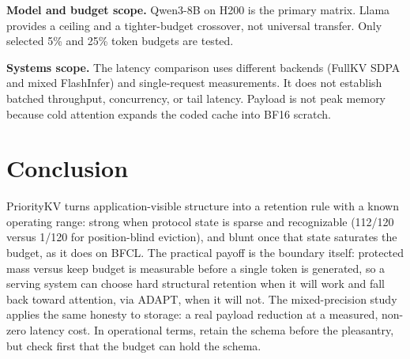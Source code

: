 \textbf{Model and budget scope.}
Qwen3-8B on H200 is the primary matrix.  Llama provides a ceiling and a
tighter-budget crossover, not universal transfer.  Only selected 5\% and 25\%
token budgets are tested.

\textbf{Systems scope.}
The latency comparison uses different backends (FullKV SDPA and mixed
FlashInfer) and single-request measurements.  It does not establish batched
throughput, concurrency, or tail latency.  Payload is not peak memory because
cold attention expands the coded cache into BF16 scratch.

\section{Conclusion}
\label{sec:conclusion}

PriorityKV turns application-visible structure into a retention rule with a
known operating range: strong when protocol state is sparse and recognizable
(112/120 versus 1/120 for position-blind eviction), and blunt once that state
saturates the budget, as it does on BFCL.  The practical payoff is the
boundary itself: protected mass versus keep budget is measurable before a
single token is generated, so a serving system can choose hard structural
retention when it will work and fall back toward attention, via ADAPT, when it
will not.  The mixed-precision study applies the same honesty to storage: a
real payload reduction at a measured, non-zero latency cost.  In operational
terms, retain the schema before the pleasantry, but check first that the
budget can hold the schema.

